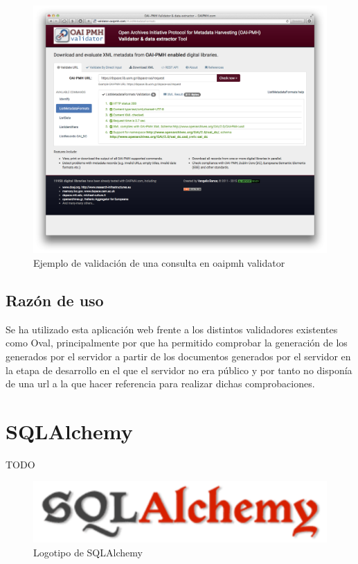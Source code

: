\begin{figure}[!htbp]
	\centering
	\includegraphics[scale=0.25]{fig/oaipmh_validator_example}
	\caption{Ejemplo de validación de una consulta en \acrshort{oaipmh} validator}
	\label{fig:oai_validator}
\end{figure}

\subsection{Razón de uso}

Se ha utilizado esta aplicación web frente a los distintos validadores existentes como Oval\cite{Oval}, principalmente por que ha permitido comprobar la generación de los  generados por el servidor a partir de los documentos generados por el servidor en la etapa de desarrollo en el que el servidor no era público y por tanto no disponía de una \acrshort{url} a la que hacer referencia para realizar dichas comprobaciones.

\section{SQLAlchemy}

TODO

\begin{figure}[!htbp]
	\centering
	\includegraphics[scale=0.5]{fig/sqla_logo}
	\caption{Logotipo de SQLAlchemy}
\end{figure}


